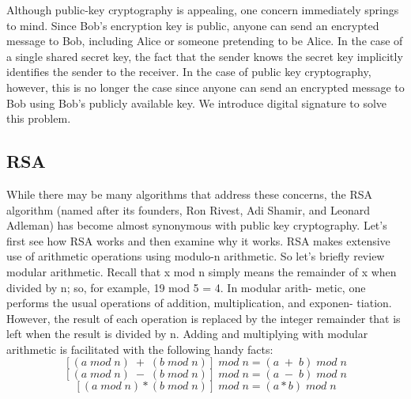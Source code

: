 \documentclass{report}
\begin{document}
{{{\Large{Although public-key cryptography is appealing, one concern immediately
springs to mind. Since Bob’s encryption key is public, anyone can send an encrypted message to Bob, including Alice or someone pretending to be Alice. In the case of
a single shared secret key, the fact that the sender knows the secret key implicitly
identifies the sender to the receiver. In the case of public key cryptography, however,
this is no longer the case since anyone can send an encrypted message to Bob using
Bob’s publicly available key. We introduce digital signature to solve this problem.
\subsection{RSA}
\Large{While there may be many algorithms that address these concerns, the RSA algorithm
(named after its founders, Ron Rivest, Adi Shamir, and Leonard Adleman) has
become almost synonymous with public key cryptography. Let’s first see how RSA
works and then examine why it works.
RSA makes extensive use of arithmetic operations using modulo-n arithmetic.
So let’s briefly review modular arithmetic. Recall that x mod n simply means the
remainder of x when divided by n; so, for example, 19 mod 5 = 4. In modular arith-
metic, one performs the usual operations of addition, multiplication, and exponen-
tiation. However, the result of each operation is replaced by the integer remainder
that is left when the result is divided by n. Adding and multiplying with modular
arithmetic is facilitated with the following handy facts:}
$$[(a \;mod \;n) \;+\; (b \;mod\; n)] \;mod \;n = (a \;+\; b) \;mod\; n$$
$$[(a \;mod \;n) \;-\; (b\; mod \;n)]\; mod \;n = (a\; -\; b) \;mod \;n$$
$$[(a\; mod\; n) * (b\; mod\; n)] \;mod \;n = (a * b) \;mod \;n$$

}}}}
\end{document}
